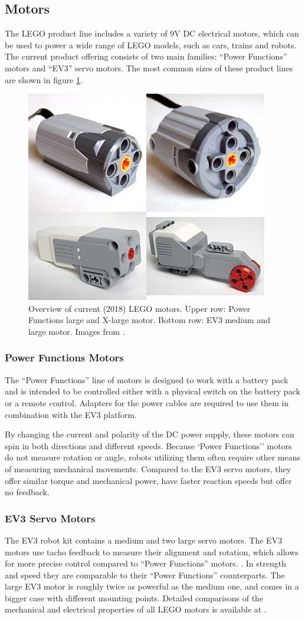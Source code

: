 \documentclass[11pt, a4paper]{article}
\begin{document}
\subsection{Motors}
The LEGO product line includes a variety of 9V DC electrical motors, which can be used to power a wide range of LEGO models, such as cars, trains and robots. The current product offering consists of two main families: ``Power Functions'' motors and ``EV3'' servo motors. The most common sizes of these product lines are shown in figure \ref{fig:motors}.

\begin{figure}
	\centering
	\includegraphics[width=0.4\linewidth]{images/motors}
	\caption{Overview of current (2018) LEGO motors. Upper row: Power Functions large and X-large motor. Bottom row: EV3 medium and large motor. Images from \cite{motor_comparison}.}
	\label{fig:motors}
\end{figure}

\subsubsection*{Power Functions Motors}
The ``Power Functions'' line of motors is designed to work with a battery pack and is intended to be controlled either with a physical switch on the battery pack or a remote control. Adapters for the power cables are required to use them in combination with the EV3 platform. \cite{power_fun}

By changing the current and polarity of the DC power supply, these motors can spin in both directions and different speeds. Because `Power Functions'' motors do not measure rotation or angle, robots utilizing them often require other means of measuring mechanical movements. Compared to the EV3 servo motors, they offer similar torque and mechanical power, have faster reaction speeds but offer no feedback. \cite{motor_comparison}


\subsubsection*{EV3 Servo Motors}
The EV3 robot kit contains a medium and two large servo motors. The EV3 motors use tacho feedback to measure their alignment and rotation, which allows for more precise control compared to ``Power Functions'' motors. \cite{Servo_Motor}. In strength and speed they are comparable to their ``Power Functions'' counterparts. The large EV3 motor is roughly twice as powerful as the medium one, and comes in a bigger case with different mounting points. Detailed comparisons of the mechanical and electrical properties of all LEGO motors is available at \cite{motor_comparison}.
\end{document}
